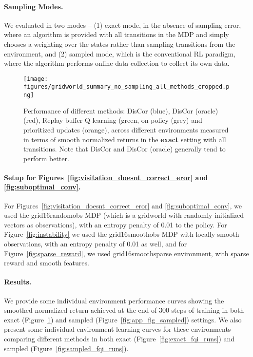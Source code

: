 \documentclass[jmlr]{article}
\begin{document}
\paragraph{Sampling Modes.} We evaluated in two modes -- (1) exact mode, in the absence of sampling error, where an algorithm is provided with all transitions in the MDP and simply chooses a weighting over the states rather than sampling transitions from the environment, and (2) sampled mode, which is the conventional RL paradigm, where the algorithm performs online data collection to collect its own data.  

\begin{figure}
    \centering
\texttt{[image: figures/gridworld\_summary\_no\_sampling\_all\_methods\_cropped.png]}
    \caption{\footnotesize{Performance of different methods: DisCor (blue), DisCor (oracle) (red), Replay buffer Q-learning (green, on-policy (grey) and prioritized updates (orange), across different environments measured in terms of smooth normalized returns in the \textbf{exact} setting with all transitions. Note that DisCor and DisCor (oracle) generally tend to perform better.}}
    \label{fig:app_fig_exact}
\end{figure}

\paragraph{Setup for Figures~\ref{fig:visitation_doesnt_correct_eror} and \ref{fig:suboptimal_conv}.} For Figures~\ref{fig:visitation_doesnt_correct_eror} and \ref{fig:suboptimal_conv}, we used the grid16randomobs MDP (which is a  gridworld with randomly initialized vectors as observations), with an entropy penalty of 0.01 to the policy. For Figure~\ref{fig:instability} we used the grid16smoothobs MDP with locally smooth observations, with an entropy penalty of 0.01 as well, and for Figure~\ref{fig:sparse_reward}, we used grid16smoothsparse environment, with sparse reward and smooth features. 

\paragraph{Results.} We provide some individual environment performance curves showing the smoothed normalized return achieved at the end of 300 steps of training in both exact (Figure~\ref{fig:app_fig_exact}) and sampled (Figure~\ref{fig:app_fig_sampled}) settings. We also present some individual-environment learning curves for these environments comparing different methods in both exact (Figure~\ref{fig:exact_fqi_runs}) and sampled (Figure~\ref{fig:sampled_fqi_runs}). 
\end{document}
